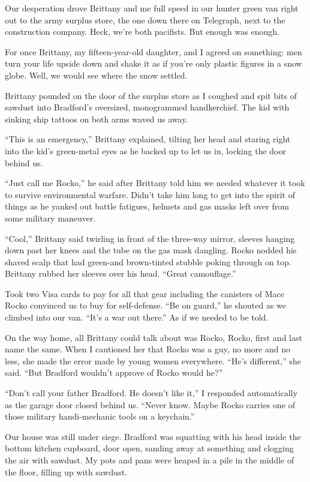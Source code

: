\documentclass[
]{article}
\begin{document}
Our desperation drove Brittany and me full speed in our hunter green van
right out to the army surplus store, the one down there on Telegraph,
next to the construction company. Heck, we're both pacifists. But enough
was enough.

For once Brittany, my fifteen-year-old daughter, and I agreed on
something: men turn your life up­side down and shake it as if you're
only plastic figures in a snow globe. Well, we would see where the snow
settled.

Brittany pounded on the door of the surplus store as I coughed and spit
bits of sawdust into Bradford's oversized, monogrammed handkerchief. The
kid with sinking ship tattoos on both arms waved us away.

``This is an emergency,'' Brittany explained, tilting her head and
staring right into the kid's green-metal eyes as he backed up to let us
in, locking the door behind us.

``Just call me Rocko,'' he said after Brittany told him we needed
whatever it took to survive environmental warfare. Didn't take him long
to get into the spirit of things as he yanked out battle fatigues,
helmets and gas masks left over from some military maneuver.

``Cool,'' Brittany said twirling in front of the three-way mirror,
sleeves hanging down past her knees and the tube on the gas mask
dangling. Rocko nodded his shaved scalp that had green-and brown-tinted
stubble poking through on top. Brittany rubbed her sleeves over his
head. ``Great camouflage.''

Took two Visa cards to pay for all that gear including the canisters of
Mace Rocko convinced us to buy for self-defense. ``Be on guard,'' he
shouted as we climbed into our van. ``It's a war out there.'' As if we
needed to be told.

On the way home, all Brittany could talk about was Rocko, Rocko, first
and last name the same. When I cautioned her that Rocko was a guy, no
more and no less, she made the error made by young women everywhere.
``He's different,'' she said. ``But Bradford wouldn't approve of Rocko
would he?''

``Don't call your father Bradford. He doesn't like it,'' I responded
automatically as the garage door closed behind us. ``Never know. Maybe
Rocko carries one of those military handi-mechanic tools on a
keychain.''

Our house was still under siege. Bradford was squatting with his head
inside the bottom kitchen cupboard, door open, sanding away at something
and clogging the air with sawdust. My pots and pans were heaped in a
pile in the middle of the floor, filling up with sawdust.
\end{document}
